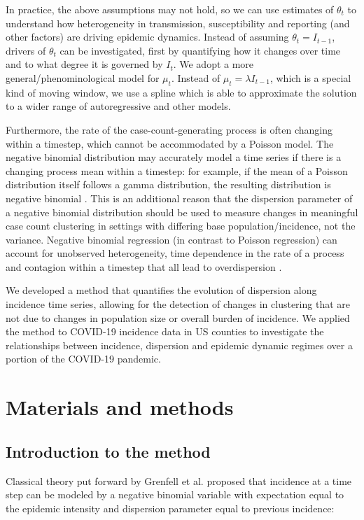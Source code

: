 \documentclass[10pt,letterpaper]{article}
\begin{document}
In practice, the above assumptions may not hold, so we can use estimates of $\theta_t$ to understand how heterogeneity in transmission, susceptibility and reporting (and other factors) are driving epidemic dynamics. Instead of assuming $\theta_t = I_{t-1}$, drivers of $\theta_t$ can be investigated, first by quantifying how it changes over time and to what degree it is governed by $I_t$. We adopt a more general/phenominological model for $\mu_t$. Instead of $\mu_t = \lambda I_{t-1}$, which is a special kind of moving window, we use a spline which is able to approximate the solution to a wider range of autoregressive and other models. 

Furthermore, the rate of the case-count-generating process is often changing within a timestep, which cannot be accommodated by a Poisson model. 
The negative binomial distribution may accurately model a time series if there is a changing process mean within a timestep: for example, if the mean of a Poisson distribution itself follows a gamma distribution, the resulting distribution is negative binomial \cite{cook_notes_nodate}. 
This is an additional reason that the dispersion parameter of a negative binomial distribution should be used to measure changes in meaningful case count clustering in settings with differing base population/incidence, not the variance. Negative binomial regression (in contrast to Poisson regression) can account for unobserved heterogeneity, time dependence in the rate of a process and contagion within a timestep that all lead to overdispersion \cite{barron_analysis_1992}.

We developed a method that quantifies the evolution of dispersion along incidence time series, allowing for the detection of changes in clustering that are not due to changes in population size or overall burden of incidence.
We applied the method to COVID-19 incidence data in US counties to investigate the relationships between incidence, dispersion and epidemic dynamic regimes over a portion of the COVID-19 pandemic. 

\section*{Materials and methods}
\subsection*{Introduction to the method}

Classical theory put forward by Grenfell et al. \cite{grenfell_dynamics_2002} proposed that incidence at a time step can be modeled by a negative binomial variable with expectation equal to the epidemic intensity and dispersion parameter equal to previous incidence:
\end{document}

